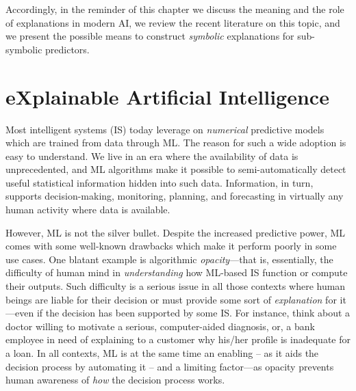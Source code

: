 \documentclass[12pt,a4paper,openright,twoside]{book}
\begin{document}
Accordingly, in the reminder of this chapter we discuss the meaning and the role of explanations in modern AI, we review the recent literature on this topic, and we present the possible means to construct \emph{symbolic} explanations for sub-symbolic predictors.

\section{eXplainable Artificial Intelligence}\label{sec:xai-background}


Most intelligent systems (IS) today leverage on \emph{numerical} predictive models which are trained from data through ML.
%
The reason for such a wide adoption is easy to understand.
%
We live in an era where the availability of data is unprecedented, and ML algorithms make it possible to semi-automatically detect useful statistical information hidden into such data.
%
Information, in turn, supports decision-making, monitoring, planning, and forecasting in virtually any human activity where data is available.

However, ML is not the silver bullet.
%
Despite the increased predictive power, ML comes with some well-known drawbacks which make it perform poorly in some use cases.
%
One blatant example is algorithmic \emph{opacity}---that is, essentially, the difficulty of human mind in \emph{understanding} how ML-based IS function or compute their outputs.
%
Such difficulty is a serious issue in all those contexts where human beings are liable for their decision or must provide some sort of \emph{explanation} for it---even if the decision has been supported by some IS.
%
For instance, think about a doctor willing to motivate a serious, computer-aided diagnosis, or, a bank employee in need of explaining to a customer why his/her profile is inadequate for a loan.
%
In all contexts, ML is at the same time an enabling -- as it aids the decision process by automating it -- and a limiting factor---as opacity prevents human awareness of \emph{how} the decision process works.
\end{document}
